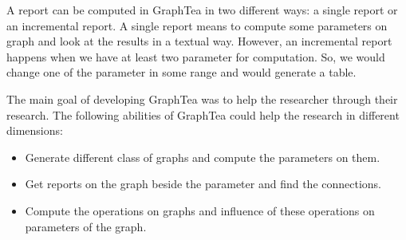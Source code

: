\documentclass[11pt, twoside,a4paper]{book}
\begin{document}
A report can be computed in GraphTea in two different ways:
a single report or an incremental report.
A single report means to compute some parameters on graph and look at the results
in a textual way. However, an incremental report happens when we have at least
two parameter for computation. So, we would change one of the parameter in
some range and would generate a table.

The main goal of developing GraphTea was to help the researcher through their research.
The following abilities of GraphTea could help the research in different dimensions:
\begin{itemize}
\item Generate different class of graphs and compute the parameters on them.
\item Get reports on the graph beside the parameter and find the connections.
\item Compute the operations on graphs and influence of these operations on parameters
of the graph.
\end{itemize}
\end{document}
